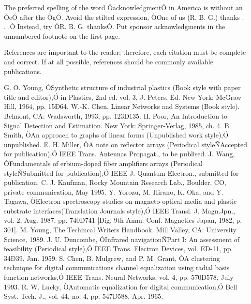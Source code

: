 \documentclass[letterpaper, 10 pt, conference]{ieeeconf}  %
\begin{document}
The preferred spelling of the word ÒacknowledgmentÓ in America is without an ÒeÓ after the ÒgÓ. Avoid the stilted expression, ÒOne of us (R. B. G.) thanks . . .Ó  Instead, try ÒR. B. G. thanksÓ. Put sponsor acknowledgments in the unnumbered footnote on the first page.




References are important to the reader; therefore, each citation must be complete and correct. If at all possible, references should be commonly available publications.



\begin{thebibliography}{99}

 G. O. Young, ÒSynthetic structure of industrial plastics (Book style with paper title and editor),Ó 	in Plastics, 2nd ed. vol. 3, J. Peters, Ed.  New York: McGraw-Hill, 1964, pp. 15Ð64.
 W.-K. Chen, Linear Networks and Systems (Book style).	Belmont, CA: Wadsworth, 1993, pp. 123Ð135.
 H. Poor, An Introduction to Signal Detection and Estimation.   New York: Springer-Verlag, 1985, ch. 4.
 B. Smith, ÒAn approach to graphs of linear forms (Unpublished work style),Ó unpublished.
 E. H. Miller, ÒA note on reflector arrays (Periodical styleÑAccepted for publication),Ó IEEE Trans. Antennas Propagat., to be publised.
 J. Wang, ÒFundamentals of erbium-doped fiber amplifiers arrays (Periodical styleÑSubmitted for publication),Ó IEEE J. Quantum Electron., submitted for publication.
 C. J. Kaufman, Rocky Mountain Research Lab., Boulder, CO, private communication, May 1995.
 Y. Yorozu, M. Hirano, K. Oka, and Y. Tagawa, ÒElectron spectroscopy studies on magneto-optical media and plastic substrate interfaces(Translation Journals style),Ó IEEE Transl. J. Magn.Jpn., vol. 2, Aug. 1987, pp. 740Ð741 [Dig. 9th Annu. Conf. Magnetics Japan, 1982, p. 301].
 M. Young, The Techincal Writers Handbook.  Mill Valley, CA: University Science, 1989.
 J. U. Duncombe, ÒInfrared navigationÑPart I: An assessment of feasibility (Periodical style),Ó IEEE Trans. Electron Devices, vol. ED-11, pp. 34Ð39, Jan. 1959.
 S. Chen, B. Mulgrew, and P. M. Grant, ÒA clustering technique for digital communications channel equalization using radial basis function networks,Ó IEEE Trans. Neural Networks, vol. 4, pp. 570Ð578, July 1993.
 R. W. Lucky, ÒAutomatic equalization for digital communication,Ó Bell Syst. Tech. J., vol. 44, no. 4, pp. 547Ð588, Apr. 1965.

\end{thebibliography}
\end{document}
